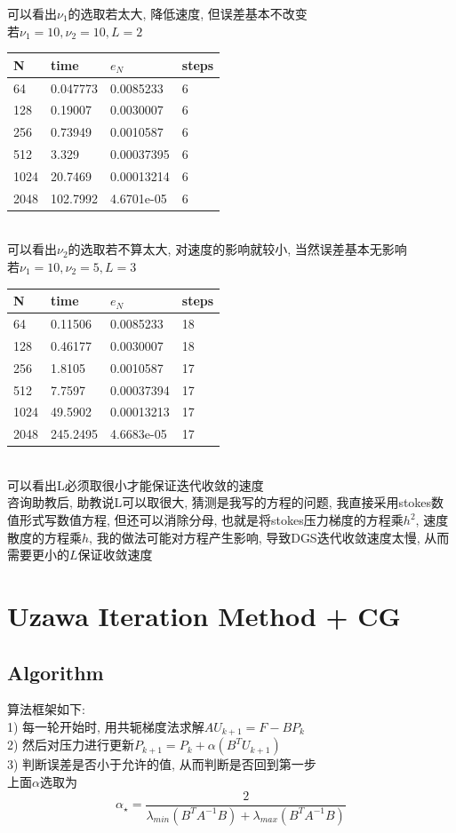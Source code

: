 \documentclass{article}
\begin{document}
可以看出$\nu_1$的选取若太大, 降低速度, 但误差基本不改变\\
若$\nu_1=10,\nu_2=10,L=2$\\
\begin{tabular}{llll}
N & time & $e_N$ & steps \\ 
\hline 
64 & 0.047773 & 0.0085233 & 6 \\ 
128 & 0.19007 & 0.0030007 & 6 \\ 
256 & 0.73949 & 0.0010587 & 6 \\ 
512 & 3.329 & 0.00037395 & 6 \\ 
1024 & 20.7469 & 0.00013214 & 6 \\ 
2048 & 102.7992 & 4.6701e-05 & 6 \\ 
\hline 
\end{tabular}\\
可以看出$\nu_2$的选取若不算太大, 对速度的影响就较小, 当然误差基本无影响\\
若$\nu_1=10,\nu_2=5,L=3$\\
\begin{tabular}{llll}
N & time & $e_N$ & steps \\ 
\hline 
64 & 0.11506 & 0.0085233 & 18 \\ 
128 & 0.46177 & 0.0030007 & 18 \\ 
256 & 1.8105 & 0.0010587 & 17 \\ 
512 & 7.7597 & 0.00037394 & 17 \\ 
1024 & 49.5902 & 0.00013213 & 17 \\ 
2048 & 245.2495 & 4.6683e-05 & 17 \\ 
\hline 
\end{tabular}\\
可以看出L必须取很小才能保证迭代收敛的速度\\
咨询助教后, 助教说L可以取很大, 猜测是我写的方程的问题, 
我直接采用stokes数值形式写数值方程, 但还可以消除分母,
也就是将stokes压力梯度的方程乘$h^2$, 速度散度的方程乘$h$, 
我的做法可能对方程产生影响, 导致DGS迭代收敛速度太慢, 
从而需要更小的$L$保证收敛速度
\section{Uzawa Iteration Method + CG}
\subsection{Algorithm}
算法框架如下:\\
1) 每一轮开始时, 用共轭梯度法求解$AU_{k+1}=F-BP_k$\\
2) 然后对压力进行更新$P_{k+1}=P_k+\alpha(B^TU_{k+1})$\\
3) 判断误差是否小于允许的值, 从而判断是否回到第一步\\
上面$\alpha$选取为\\
$$
\alpha_{\star}=\frac{2}{\lambda_{min}(B^TA^{-1}B)+\lambda_{max}(B^TA^{-1}B)}
$$
\end{document}
